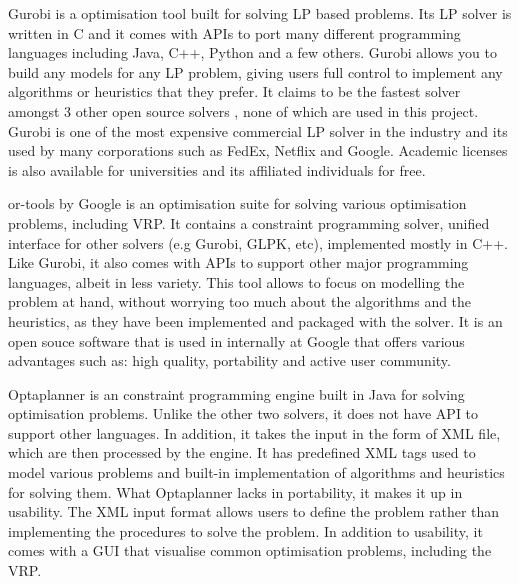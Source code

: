 Gurobi is a optimisation tool built for solving LP based problems. Its LP solver is written in C and it comes with
APIs to port many different programming languages including Java, C++, Python and a few others. Gurobi allows you
to build any models for any LP problem, giving users full control to implement any algorithms or heuristics that they
prefer. It claims to be the fastest solver amongst 3 other open source solvers \cite{gurobi:solvers}, none
of which are used in this project. Gurobi is one of the most expensive commercial LP solver in the industry
and its used by many corporations such as FedEx, Netflix and Google. Academic licenses is also available for universities
and its affiliated individuals for free.

or-tools by Google is an optimisation suite for solving various optimisation problems, including VRP. It contains a constraint programming
solver, unified interface for other solvers (e.g Gurobi, GLPK, etc), implemented mostly in C++. Like Gurobi, it also comes with APIs
to support other major programming languages, albeit in less variety. This tool allows to focus on modelling the problem at hand, without worrying
too much about the algorithms and the heuristics, as they have been implemented and packaged with the solver. It is an open souce
software that is used in internally at Google that offers various advantages such as: high quality, portability and active user community.

Optaplanner is an constraint programming engine built in Java for solving optimisation problems. Unlike the other two solvers, it does not
have API to support other languages. In addition, it takes the input in the form of XML file, which are then processed by the engine. It has
predefined XML tags used to model various problems and built-in implementation of algorithms and heuristics for solving them. What Optaplanner
lacks in portability, it makes it up in usability. The XML input format allows users to define the problem rather than implementing the procedures
to solve the problem. In addition to usability, it comes with a GUI that visualise common optimisation problems, including the VRP.


